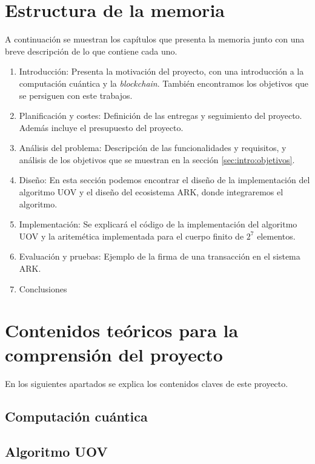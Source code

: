 \section{Estructura de la memoria}

A continuación se muestran los capítulos que presenta la memoria junto con una breve descripción de lo que contiene cada uno.

\begin{enumerate}
	\item Introducción: Presenta la motivación del proyecto, con una introducción a la computación cuántica y la \textit{blockchain}. También encontramos los objetivos que se persiguen con este trabajos.
	\item Planificación y costes: Definición de las entregas y seguimiento del proyecto. Además incluye el presupuesto del proyecto.
	\item Análisis del problema: Descripción de las funcionalidades y requisitos, y análisis de los objetivos que se muestran en la sección \ref{sec:intro:objetivos}.
	\item Diseño: En esta sección podemos encontrar el diseño de la implementación del algoritmo UOV y el diseño del ecosistema ARK, donde integraremos el algoritmo.
	\item Implementación: Se explicará el código de la implementación del algoritmo UOV y la aritemética implementada para el cuerpo finito de $2^7$ elementos.
	\item Evaluación y pruebas: Ejemplo de la firma de una transacción en el sistema ARK.
	\item Conclusiones
\end{enumerate}

\section{Contenidos teóricos para la comprensión del proyecto}

En los siguientes apartados se explica los contenidos claves de este proyecto.

\subsection{Computación cuántica}

\subsection{Algoritmo UOV}

